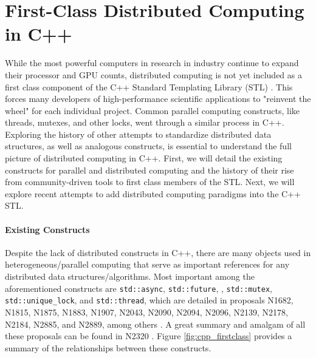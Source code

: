 \section{First-Class Distributed Computing in C++} \label{first_class_dist_cpp}
While the most powerful computers in research in industry continue to expand their processor and GPU counts,
distributed computing is not yet included as a first class component of the C++ Standard Templating Library (STL) \cite{towards_dist_cpp}. This forces many developers of high-performance scientific applications to "reinvent the wheel" for each individual project.  Common parallel computing constructs, like threads, mutexes, and other locks, went through a similar process in C++. Exploring the history of other attempts to standardize distributed data structures, as well as analogous constructs, is essential to understand the full picture of distributed computing in C++. First, we will detail the existing constructs for parallel and distributed computing and the history of their rise from community-driven tools to first class members of the STL. Next, we will explore recent attempts to add distributed computing paradigms into the C++ STL. 


\paragraph{Existing Constructs}
Despite the lack of distributed constructs in C++, there are many objects used in heterogeneous/parallel computing that serve as important references for any distributed data structures/algorithms. Most important among the aforementioned constructs are \texttt{std::async}, \texttt{std::future}, , \texttt{std::mutex}, \texttt{std::unique\_lock}, and \texttt{std::thread}, which are detailed in proposals N1682, N1815, N1875, N1883, N1907, N2043, N2090, N2094,  N2096, N2139, N2178, N2184, N2885, and N2889, among others  \cite{n1682} \cite{n1815} \cite{n1875} \cite{n1883} \cite{n1907} \cite{n2043} \cite{n2096} \cite{n2139} \cite{n2178} \cite{n2184} \cite{n2285} \cite{n2889}. A great summary and amalgam of all these proposals can be found in N2320 \cite{n2320}. Figure \ref{fig:cpp_firstclass} provides a summary of the relationships between these constructs.

